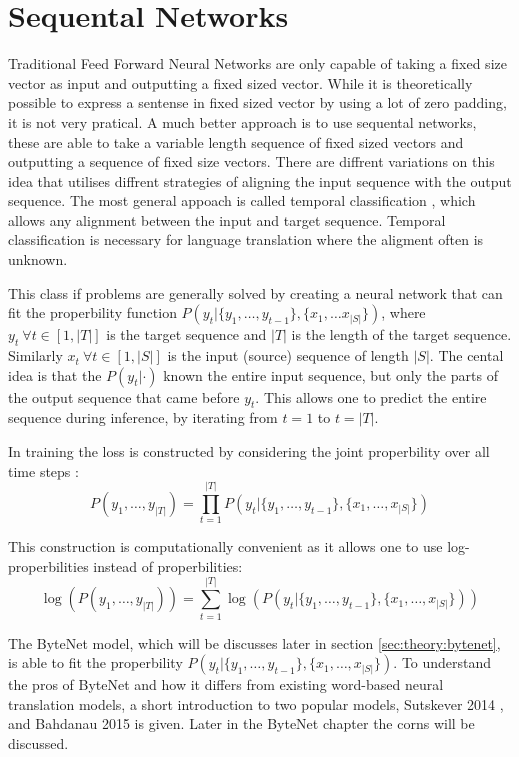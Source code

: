 \section{Sequental Networks}

Traditional Feed Forward Neural Networks are only capable of taking a fixed size vector as input and outputting a fixed sized vector. While it is theoretically possible to express a sentense in fixed sized vector by using a lot of zero padding, it is not very pratical. A much better approach is to use sequental networks, these are able to take a variable length sequence of fixed sized vectors and outputting a sequence of fixed size vectors. There are diffrent variations on this idea that utilises diffrent strategies of aligning the input sequence with the output sequence. The most general appoach is called temporal classification \cite{alexgraves}, which allows any alignment between the input and target sequence. Temporal classification is necessary for language translation where the aligment often is unknown.

This class if problems are generally solved by creating a neural network that can fit the properbility function $P(y_t | \{y_1, \dots, y_{t-1}\}, \{x_1, \dots x_{|S|}\})$, where $y_t\ \forall t \in [1, |T|]$ is the target sequence and $|T|$ is the length of the target sequence. Similarly $x_t\ \forall t \in [1, |S|]$ is the input (source) sequence of length $|S|$. The cental idea is that the $P(y_t| \cdot)$ known the entire input sequence, but only the parts of the output sequence that came before $y_t$. This allows one to predict the entire sequence during inference, by iterating from $t = 1$ to $t = |T|$.

In training the loss is constructed by considering the joint properbility over all time steps \cite{alexgraves}:
\begin{equation}
P(y_1, \dots, y_{|T|}) = \prod_{t=1}^{|T|} P(y_t | \{y_1, \dots, y_{t-1}\}, \{x_1, \dots, x_{|S|}\})
\end{equation}

This construction is computationally convenient as it allows one to use log-properbilities instead of properbilities:
\begin{equation}
\log(P(y_1, \dots, y_{|T|})) = \sum_{t=1}^{|T|} \log(P(y_t | \{y_1, \dots, y_{t-1}\}, \{x_1, \dots, x_{|S|}\}))
\end{equation}

The ByteNet model, which will be discusses later in section \ref{sec:theory:bytenet}, is able to fit the properbility $P(y_t | \{y_1, \dots, y_{t-1}\}, \{x_1, \dots, x_{|S|}\})$. To understand the pros of ByteNet and how it differs from existing word-based neural translation models, a short introduction to two popular models, Sutskever 2014 \cite{sutskever-2014-nmt}, and Bahdanau 2015 \cite{bahdanau-2015-nmt} is given. Later in the ByteNet chapter the corns will be discussed.

